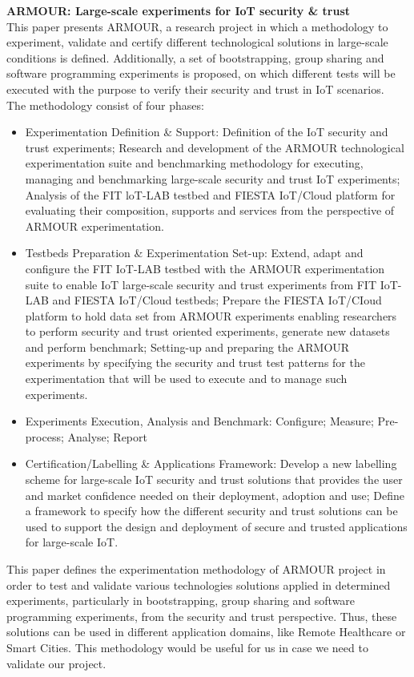 \textbf{ARMOUR: Large-scale experiments for IoT security \& trust}\cite{Paper6}\\
This paper presents ARMOUR, a research project in which a methodology to experiment, validate and certify different technological solutions in large-scale conditions is defined. Additionally, a set of bootstrapping, group sharing and software programming experiments is proposed, on which different tests will be executed with the purpose to verify their security and trust in IoT scenarios.\\
The methodology consist of four phases:
\begin{itemize}
	\item Experimentation Definition \& Support: Definition of the IoT security and trust experiments; Research and development of the ARMOUR technological experimentation suite and benchmarking methodology for executing, managing and benchmarking large-scale security and trust IoT experiments; Analysis of the FIT loT-LAB testbed and FIESTA IoT/Cloud platform for evaluating their composition, supports and services from the perspective of ARMOUR experimentation.
	
	\item Testbeds Preparation \& Experimentation Set-up: Extend, adapt and configure the FIT IoT-LAB testbed with the ARMOUR experimentation suite to enable IoT large-scale security and trust experiments from FIT IoT-LAB and FIESTA IoT/Cloud testbeds;	Prepare the FIESTA IoT/CIoud platform to hold data set from ARMOUR experiments enabling researchers to perform security and trust oriented experiments, generate new datasets and perform benchmark; Setting-up and preparing the ARMOUR experiments by specifying the security and trust test patterns for the experimentation that will be used to execute and to manage such experiments.
	
	\item Experiments Execution, Analysis and Benchmark: Configure; Measure; Pre-process; Analyse; Report
	
	\item Certification/Labelling \& Applications Framework: Develop a new labelling scheme for large-scale IoT security and trust solutions that provides the user and market confidence needed on their deployment, adoption and use; Define a framework to specify how the different security and trust solutions can be used to support the design and deployment of secure and trusted applications for large-scale IoT.
\end{itemize}
This paper defines the experimentation methodology of ARMOUR project in order to test and validate various technologies solutions applied in determined experiments, particularly in bootstrapping, group sharing and software programming experiments, from the security and trust perspective. Thus, these solutions can be used in different application domains, like Remote Healthcare or Smart Cities.
This methodology would be useful for us in case we need to validate our project.

